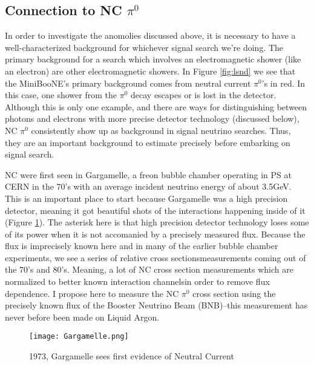 \documentclass[12pt]{article}
\begin{document}
\subsection{Connection to NC $\pi^0$}
In order to investigate the anomolies discussed above, it is necessary to have a well-characterized background for whichever signal search we're doing.  The primary background for a search which involves an electromagnetic shower (like an electron) are other electromagnetic showers.  In Figure \ref{fig:lsnd} we see that the MiniBooNE's primary background comes from neutral current $\pi^0$'s in red.  In this case, one shower from the $\pi^0$ decay escapes or is lost in the detector.  Although this is only one example, and there are ways for distinguishing between photons and electrons with more precise detector technology (discussed below), NC $\pi^0$ consistently show up as background in signal neutrino searches. Thus, they are an important background to estimate precisely before embarking on signal search.  
\par NC were first seen in Gargamelle, a freon bubble chamber operating in PS at CERN in the 70's with an average incident neutrino energy of about 3.5GeV.  This is an important place to start because Gargamelle was a high precision detector, meaning it got beautiful shots of the interactions happening inside of it (Figure \ref{fig:gar}).  The asterisk here is that high precision detector technology loses some of its power when it is not accomanied by a precisely measured flux. Because the flux is imprecisely known here and in many of the earlier bubble chamber experiments, we see a series of relative cross sectionsmeasurements coming out of the 70's and 80's. Meaning, a lot of NC cross section measurements which are normalized to better known interaction channelsin order to remove flux dependence. I propose here to measure the NC $\pi^0$ cross section using the precisely known flux of the Booster Neutrino Beam (BNB)--this measurement has never before been made on Liquid Argon.  

\begin{figure}[h!]
\centering
\texttt{[image: Gargamelle.png]}
\caption{1973, Gargamelle sees first evidence of Neutral Current}
\label{fig:gar}
\end{figure}

\newpage
\end{document}
